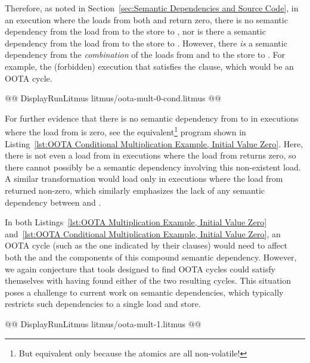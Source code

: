 \documentclass[10]{article}
\begin{document}
Therefore, as noted in
Section~\ref{sec:Semantic Dependencies and Source Code},
in an execution where the loads from both  and  return zero,
there is no semantic dependency from the load from  to the
store to , nor is there a semantic dependency from the load
from  to the store to .
However, there \emph{is} a semantic dependency from the \emph{combination}
of the loads from  and  to the store to .
For example, the (forbidden) execution that satisfies the 
clause, which would be an OOTA cycle.

\begin{listing}[tbp]
@@ DisplayRunLitmus litmus/oota-mult-0-cond.litmus @@
\caption{OOTA Conditional Multiplication Example, Initial Value Zero}
\label{lst:OOTA Conditional Multiplication Example, Initial Value Zero}
\end{listing}

For further evidence that there is no semantic dependency from 
to  in executions where the load from  is zero, see the
equivalent\footnote{
	But equivalent only because the atomics are all non-volatile!}
program shown in
Listing~\ref{lst:OOTA Conditional Multiplication Example, Initial Value Zero}.
Here, there is not even a load from  in executions where the
load from  returns zero, so there cannot possibly be a semantic
dependency involving this non-existent load.
A similar transformation would load  only in executions where the
load from  returned non-zero, which similarly emphasizes the lack
of any semantic dependency between  and .

In both
Listings~\ref{lst:OOTA Multiplication Example, Initial Value Zero}
and~\ref{lst:OOTA Conditional Multiplication Example, Initial Value Zero},
an OOTA cycle (such as the one indicated by their  clauses)
would need to affect both the  and the  components of this
compound semantic dependency.
However, we again conjecture that tools designed to find OOTA cycles could
satisfy themselves with having found either of the two resulting cycles.
This situation poses a challenge to current work on semantic dependencies,
which typically restricts such dependencies to a single load and store.

\begin{listing}[tbp]
@@ DisplayRunLitmus litmus/oota-mult-1.litmus @@
\caption{OOTA Multiplication Example, Initial Value 1}
\label{lst:OOTA Multiplication Example, Initial Value 1}
\end{listing}
\end{document}
